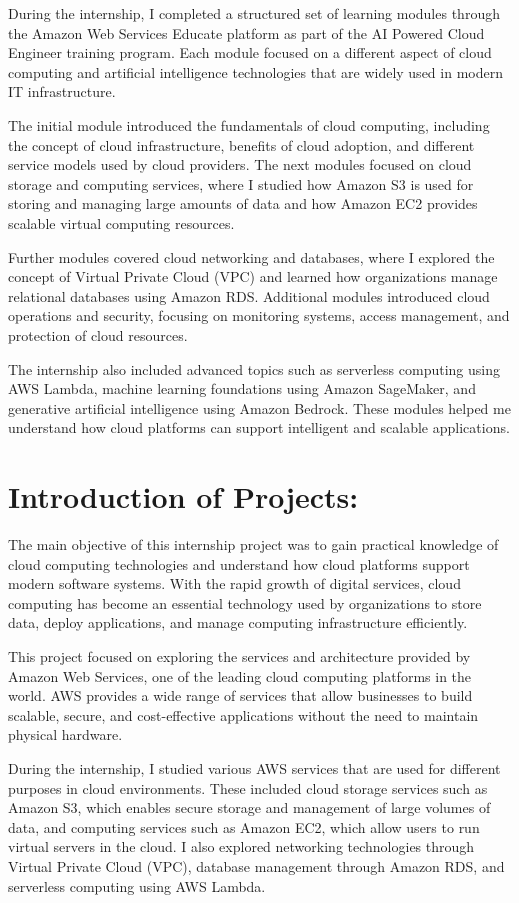 \documentclass[12pt, a4paper, oneside]{report}
\begin{document}
During the internship, I completed a structured set of learning modules through the 
Amazon Web Services Educate platform as part of the AI Powered Cloud Engineer 
training program. Each module focused on a different aspect of cloud computing and 
artificial intelligence technologies that are widely used in modern IT infrastructure.

The initial module introduced the fundamentals of cloud computing, including the 
concept of cloud infrastructure, benefits of cloud adoption, and different service models 
used by cloud providers. The next modules focused on cloud storage and computing 
services, where I studied how Amazon S3 is used for storing and managing large 
amounts of data and how Amazon EC2 provides scalable virtual computing resources.

Further modules covered cloud networking and databases, where I explored the concept 
of Virtual Private Cloud (VPC) and learned how organizations manage relational 
databases using Amazon RDS. Additional modules introduced cloud operations and 
security, focusing on monitoring systems, access management, and protection of cloud 
resources.

The internship also included advanced topics such as serverless computing using AWS 
Lambda, machine learning foundations using Amazon SageMaker, and generative 
artificial intelligence using Amazon Bedrock. These modules helped me understand how 
cloud platforms can support intelligent and scalable applications.
\newpage
\section{Introduction of Projects:}

The main objective of this internship project was to gain practical knowledge of cloud 
computing technologies and understand how cloud platforms support modern software 
systems. With the rapid growth of digital services, cloud computing has become an 
essential technology used by organizations to store data, deploy applications, and 
manage computing infrastructure efficiently.

This project focused on exploring the services and architecture provided by Amazon 
Web Services, one of the leading cloud computing platforms in the world. AWS 
provides a wide range of services that allow businesses to build scalable, secure, and 
cost-effective applications without the need to maintain physical hardware.

During the internship, I studied various AWS services that are used for different 
purposes in cloud environments. These included cloud storage services such as 
Amazon S3, which enables secure storage and management of large volumes of data, 
and computing services such as Amazon EC2, which allow users to run virtual servers 
in the cloud. I also explored networking technologies through Virtual Private Cloud 
(VPC), database management through Amazon RDS, and serverless computing using 
AWS Lambda.
\end{document}
